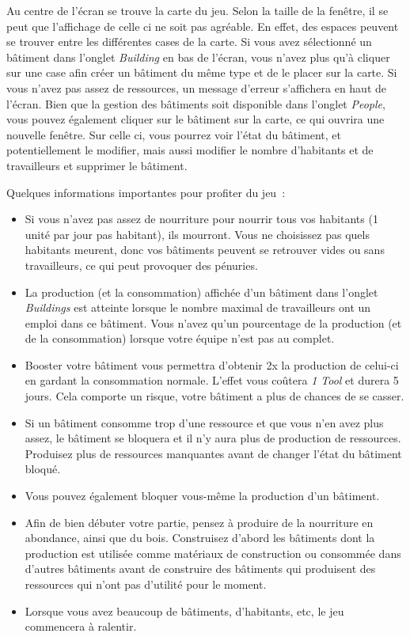 \documentclass{article}
\begin{document}
Au centre de l'écran se trouve la carte du jeu. Selon la taille de la fenêtre, il se peut
que l'affichage de celle ci ne soit pas agréable. En effet, des espaces peuvent se trouver
entre les différentes cases de la carte.
Si vous avez sélectionné un bâtiment dans l'onglet \textit{Building} en bas de l'écran, vous n'avez plus qu'à cliquer sur une case
afin créer un bâtiment du même type et de le placer sur la carte. Si vous n'avez pas assez de ressources,
un message d'erreur s'affichera en haut de l'écran. Bien que la gestion des bâtiments soit disponible
dans l'onglet \textit{People}, vous pouvez également cliquer sur le bâtiment sur la carte, ce qui ouvrira une 
nouvelle fenêtre. Sur celle ci, vous pourrez voir l'état du bâtiment, et potentiellement le modifier, mais aussi modifier le nombre
d'habitants et de travailleurs et supprimer le bâtiment.

Quelques informations importantes pour profiter du jeu :
\begin{itemize}
\item Si vous n'avez pas assez de nourriture pour nourrir tous vos habitants (1 unité par jour pas habitant),
ils mourront. Vous ne choisissez pas quels habitants meurent, donc vos bâtiments peuvent se retrouver vides ou sans travailleurs, ce qui peut provoquer des pénuries.
\item La production (et la consommation) affichée d'un bâtiment dans l'onglet \textit{Buildings} est atteinte lorsque le nombre maximal de
travailleurs ont un emploi dans ce bâtiment. Vous n'avez qu'un pourcentage de la production (et de la consommation) lorsque votre équipe n'est pas au complet.
\item Booster votre bâtiment vous permettra d'obtenir 2x la production de celui-ci en gardant la consommation normale. L'effet vous coûtera
\textit{1 Tool} et durera 5 jours. Cela comporte un risque, votre bâtiment a plus de chances de se casser.
\item Si un bâtiment consomme trop d'une ressource et que vous n'en avez plus assez, le bâtiment se bloquera et il n'y aura
plus de production de ressources. Produisez plus de ressources manquantes avant de changer l'état du bâtiment bloqué.
\item Vous pouvez également bloquer vous-même la production d'un bâtiment.
\item Afin de bien débuter votre partie, pensez à produire de la nourriture en abondance, ainsi que du bois. Construisez d'abord les bâtiments dont la production est utilisée
comme matériaux de construction ou consommée dans d'autres bâtiments avant de construire des bâtiments qui produisent des ressources qui n'ont pas d'utilité pour le moment.
\item Lorsque vous avez beaucoup de bâtiments, d'habitants, etc, le jeu commencera à ralentir.
\end{itemize}
\end{document}
